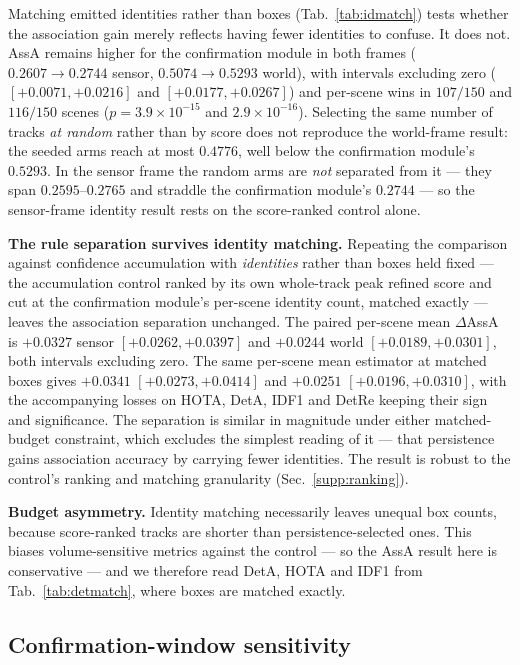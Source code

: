 Matching emitted identities rather than boxes
(Tab.~\ref{tab:idmatch}) tests whether the association gain merely reflects
having fewer identities to confuse. It does not. AssA remains higher for the
confirmation module in both frames ($0.2607\!\to\!0.2744$ sensor,
$0.5074\!\to\!0.5293$ world), with intervals excluding zero
($[{+}0.0071,{+}0.0216]$ and $[{+}0.0177,{+}0.0267]$) and per-scene wins in
$107/150$ and $116/150$ scenes ($p{=}3.9{\times}10^{-15}$ and
$2.9{\times}10^{-16}$). Selecting the same number of tracks \emph{at random}
rather than by score does not reproduce the world-frame result: the seeded arms
reach at most $0.4776$, well below the confirmation module's $0.5293$. In the
sensor frame the random arms are \emph{not} separated from it --- they span
$0.2595$--$0.2765$ and straddle the confirmation module's $0.2744$ --- so the
sensor-frame identity result rests on the score-ranked control alone.

\noindent\textbf{The rule separation survives identity matching.} Repeating the
comparison against confidence accumulation with \emph{identities} rather than
boxes held fixed --- the accumulation control ranked by its own whole-track peak refined score
and cut at the confirmation module's per-scene identity count, matched exactly
--- leaves the association separation unchanged. The paired per-scene mean
$\Delta$AssA is $+0.0327$ sensor $[{+}0.0262,{+}0.0397]$ and $+0.0244$ world
$[{+}0.0189,{+}0.0301]$, both intervals excluding zero. The same per-scene mean
estimator at matched boxes gives $+0.0341$ $[{+}0.0273,{+}0.0414]$ and
$+0.0251$ $[{+}0.0196,{+}0.0310]$, with
the accompanying losses
on HOTA, DetA, IDF1 and DetRe keeping their sign and significance. The
separation is similar in magnitude under either matched-budget constraint, which excludes
the simplest reading of it --- that persistence gains association accuracy by
carrying fewer identities. The result is robust to the control's ranking and
matching granularity (Sec.~\ref{supp:ranking}).

\noindent\textbf{Budget asymmetry.} Identity matching necessarily leaves
unequal box counts, because score-ranked tracks are shorter than
persistence-selected ones. This biases volume-sensitive metrics against the
control --- so the AssA result here is conservative --- and we therefore read
DetA, HOTA and IDF1 from Tab.~\ref{tab:detmatch}, where boxes are matched
exactly.

\subsection{Confirmation-window sensitivity}
\label{sec:nsweep}

